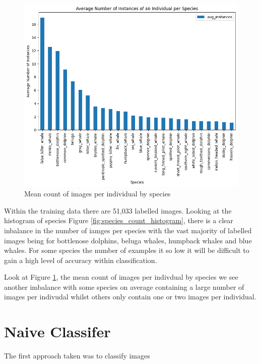 \documentclass{article}
\begin{document}
\begin{figure}[h!]
    \includegraphics[width=\linewidth]{mean_individuals_histogram.png}
    \caption{Mean count of images per individual by species}
    \label{fig:individual_mean_count_histogram}
\end{figure}

Within the training data there are 51,033 labelled images. Looking at the histogram of species Figure \ref{fig:species_count_histogram}, there is a clear inbalance in the number of iamges per species with the vast majority
of labelled images being for bottlenose dolphins, beluga whales, humpback whales and blue whales. For some species the number of examples it so low it will be difficult to gain a high level of accuracy within classification.

Look at Figure \ref{fig:individual_mean_count_histogram}, the mean count of images per indivdual by species we see another imbalance with some species on average containing a large number of images per indivudal whilst others only contain one or two images per individual.


\section{Naive Classifer}

The first approach taken was to classify images
\end{document}
